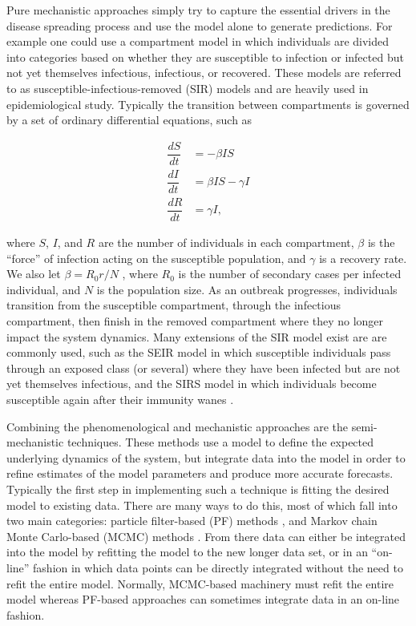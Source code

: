 Pure mechanistic approaches simply try to capture the essential drivers in the disease spreading process and use the model alone to generate predictions. For example one could use a compartment model in which individuals are divided into categories based on whether they are susceptible to infection or infected but not yet themselves infectious, infectious, or recovered. These models are referred to as susceptible-infectious-removed (SIR) models and are heavily used in epidemiological study. Typically the transition between compartments is governed by a set of ordinary differential equations, such as 

\begin{equation}\label{sirode}
    \begin{array}{rl}
        \dfrac{dS}{dt} & = - \beta I S \\
        \dfrac{dI}{dt} & = \beta I S - \gamma I  \\
        \dfrac{dR}{dt} & = \gamma I,
    \end{array}
\end{equation}

where $S$, $I$, and $R$ are the number of individuals in each compartment, $\beta$ is the ``force'' of infection acting on the susceptible population, and $\gamma$ is a recovery rate. We also let $\beta = R_0 r / N$ , where $R_0$ is the number of secondary cases per infected individual, and $N$ is the population size. As an outbreak progresses, individuals transition from the susceptible compartment, through the infectious compartment, then finish in the removed compartment where they no longer impact the system dynamics. Many extensions of the SIR model exist are are commonly used, such as the SEIR model in which susceptible individuals pass through an exposed class (or several) where they have been infected but are not yet themselves infectious, and the SIRS model in which individuals become susceptible again after their immunity wanes \cite{Camacho2011}.

Combining the phenomenological and mechanistic approaches are the semi-mechanistic techniques. These methods use a model to define the expected underlying dynamics of the system, but integrate data into the model in order to refine estimates of the model parameters and produce more accurate forecasts. Typically the first step in implementing such a technique is fitting the desired model to existing data. There are many ways to do this, most of which fall into two main categories: particle filter-based (PF) methods \cite{Arulampalam2002}\cite{Sau1918}\cite{Yang2014}, and Markov chain Monte Carlo-based (MCMC) methods \cite{Andrieu2003}\cite{Neal2011}. From there data can either be integrated into the model by refitting the model to the new longer data set, or in an ``on-line'' fashion in which data points can be directly integrated without the need to refit the entire model. Normally, MCMC-based machinery must refit the entire model whereas PF-based approaches can sometimes integrate data in an on-line fashion.

